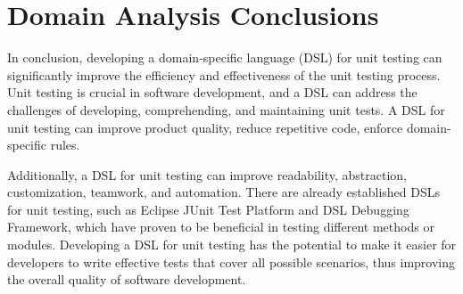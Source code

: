 \section{Domain Analysis Conclusions}
In conclusion, developing a domain-specific language (DSL) for unit testing can significantly improve the efficiency and effectiveness of the unit testing process. Unit testing is crucial in software development, and a DSL can address the challenges of developing, comprehending, and maintaining unit tests. A DSL for unit testing can improve product quality, reduce repetitive code, enforce domain-specific rules.

Additionally, a DSL for unit testing can improve readability, abstraction, customization, teamwork, and automation. There are already established DSLs for unit testing, such as Eclipse JUnit Test Platform and DSL Debugging Framework, which have proven to be beneficial in testing different methods or modules. Developing a DSL for unit testing has the potential to make it easier for developers to write effective tests that cover all possible scenarios, thus improving the overall quality of software development.